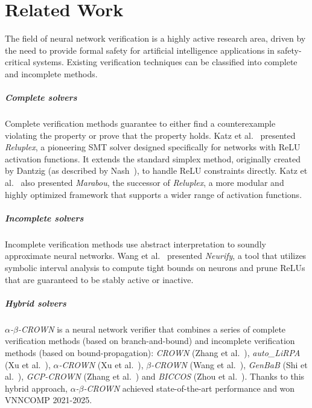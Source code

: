 \chapter{Related Work}
\label{ch:related-work}

The field of neural network verification is a highly active research area, driven by the need to
provide formal safety for artificial intelligence applications in safety-critical systems.
Existing verification techniques can be classified into complete and incomplete methods.

\paragraph{Complete solvers}
Complete verification methods guarantee to either find a counterexample violating the property or
prove that the property holds. Katz et al.~\cite{katz2017reluplex} presented \textit{Reluplex}, a
pioneering SMT solver designed specifically for networks with ReLU activation functions. It extends
the standard simplex method, originally created by Dantzig (as described by
Nash~\cite{dantzig1947simplex}), to handle ReLU constraints directly. Katz et
al.~\cite{katz2019marabou} also presented \textit{Marabou}, the successor of \textit{Reluplex}, a
more modular and highly optimized framework that supports a wider range of activation functions.

\paragraph{Incomplete solvers}
Incomplete verification methods use abstract interpretation to soundly approximate neural networks.
Wang et al.~\cite{wang2018efficientformalsafetyanalysis} presented \textit{Neurify}, a tool that
utilizes symbolic interval analysis to compute tight bounds on neurons and prune ReLUs that are
guaranteed to be stably active or inactive.

\paragraph{Hybrid solvers}
\textit{$\alpha$-$\beta$-CROWN} is a neural network verifier that combines a series of complete
verification methods (based on branch-and-bound) and incomplete verification methods (based on
bound-propagation): \textit{CROWN} (Zhang et al.~\cite{zhang2018efficient}), \textit{auto\_LiRPA}
(Xu et al.~\cite{xu2020automatic}), \textit{$\alpha$-CROWN} (Xu et al.~\cite{xu2021fast}),
\textit{$\beta$-CROWN} (Wang et al.~\cite{wang2021beta}), \textit{GenBaB} (Shi et
al.~\cite{shi2024genbab}), \textit{GCP-CROWN} (Zhang et al.~\cite{zhang2022general}) and
\textit{BICCOS} (Zhou et al.~\cite{zhou2024scalable}). Thanks to this hybrid approach, 
\textit{$\alpha$-$\beta$-CROWN} achieved state-of-the-art performance and won VNNCOMP 2021-2025.

